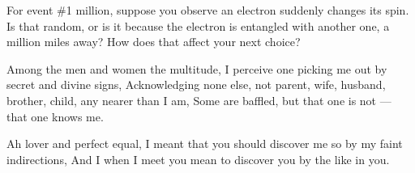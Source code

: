 For event \#1 million, suppose you observe an electron suddenly changes its spin. Is that random, or is it because the
electron is entangled with another one, a million miles away? How does that affect your next choice?

\begin{quotex}
Among the men and women the multitude,\newline
I perceive one picking me out by secret and divine signs,\newline
Acknowledging none else, not parent, wife, husband, brother, child, any nearer than I am,\newline
Some are baffled, but that one is not — that one knows me. 

Ah lover and perfect equal,\newline
I meant that you should discover me so by my faint indirections,\newline
And I when I meet you mean to discover you by the like in you.  

\end{quotex}

